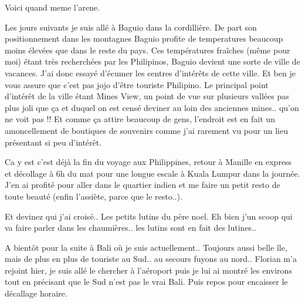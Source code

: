 \begin{multicols}{2}
Voici quand meme l'arene.


Les jours suivants je suis allé à Baguio dans la cordillière. De part son positionnement dans les montagnes Baguio profite de temperatures beaucoup moins élevées que dans le reste du pays. Ces températures fraîches (même pour moi) étant très recherchées par les Philipinos, Baguio devient une sorte de ville de vacances. J'ai donc essayé d'écumer les centres d'intérêts de cette ville. Et ben je vous assure que c'est pas jojo d'être touriste Philipino. Le principal point d'intérêt de la ville étant Mines View, un point de vue sur plusieurs vallées pas plus joli que ça et duquel on est censé deviner au loin des anciennes mines.. qu'on ne voit pas !! Et comme ça attire beaucoup de gens, l'endroit est en fait un amoncellement de boutiques de souvenirs comme j'ai rarement vu pour un lieu présentant si peu d'intérêt.


Ca y est c'est déjà la fin du voyage aux Philippines, retour à Manille en express et décollage à 6h du mat pour une longue escale à Kuala Lumpur dans la journée. J'en ai profité pour aller dans le quartier indien et me faire un petit resto de toute beauté (enfin l'assiète, parce que le resto..).


Et devinez qui j'ai croisé.. Les petits lutins du père noel. Eh bien j'un scoop qui va faire parler dans les chaumières.. les lutins sont en fait des lutines..


A bientôt pour la suite à Bali où je suis actuellement.. Toujours aussi belle île, mais de plus en plus de touriste au Sud.. au secours fuyons au nord.. Florian m'a rejoint hier, je suis allé le chercher à l'aéroport puis je lui ai montré les environs tout en précisant que le Sud n'est pas le vrai Bali. Puis repos pour encaisser le décallage horaire.

\end{multicols}


